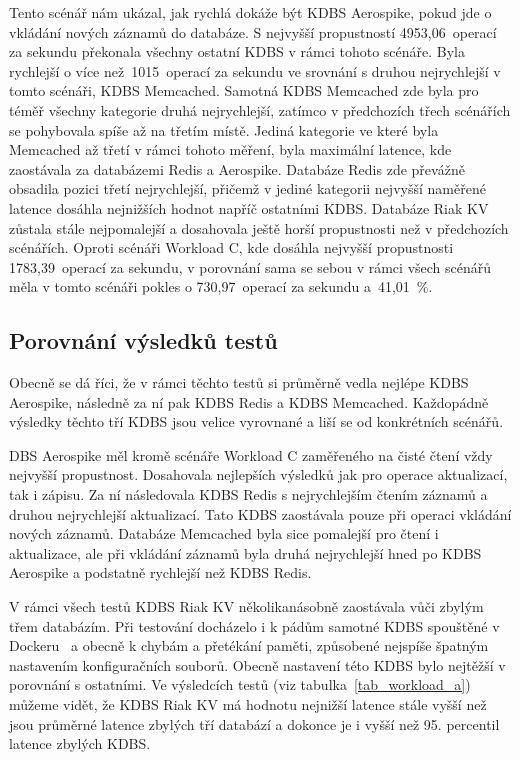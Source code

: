 \documentclass[czech,master,dept460,male,csharp,cpdeclaration]{diploma}
\begin{document}
	Tento scénář nám ukázal, jak rychlá dokáže být KDBS Aerospike, pokud jde o vkládání nových záznamů do databáze. S nejvyšší propustností 4953,06~operací za sekundu překonala všechny ostatní KDBS v rámci tohoto scénáře. Byla rychlejší o více než~1015~operací za sekundu ve srovnání s druhou nejrychlejší v tomto scénáři, KDBS Memcached. Samotná KDBS Memcached zde byla pro téměř všechny kategorie druhá nejrychlejší, zatímco v předchozích třech scénářích se pohybovala spíše až na třetím místě. Jediná kategorie ve které byla Memcached až třetí v rámci tohoto měření, byla maximální latence, kde zaostávala za databázemi Redis a Aerospike. Databáze Redis zde převážně obsadila pozici třetí nejrychlejší, přičemž v jediné kategorii nejvyšší naměřené latence dosáhla nejnižších hodnot napříč ostatními KDBS. Databáze Riak KV zůstala stále nejpomalejší a dosahovala ještě horší propustnosti než v předchozích scénářích. Oproti scénáři Workload C, kde dosáhla nejvyšší propustnosti 1783,39~operací za sekundu, v porovnání sama se sebou v rámci všech scénářů měla v tomto scénáři pokles o 730,97~operací za sekundu a~41,01~\%.
	
	\subsection{Porovnání výsledků testů}
	
	Obecně se dá říci, že v rámci těchto testů si průměrně vedla nejlépe KDBS Aerospike, následně za ní pak KDBS Redis a KDBS Memcached. Každopádně výsledky těchto tří KDBS jsou velice vyrovnané a liší se od konkrétních scénářů.
	
	DBS Aerospike měl kromě scénáře Workload C zaměřeného na čisté čtení vždy nejvyšší propustnost. Dosahovala nejlepších výsledků jak pro operace aktualizací, tak i zápisu. Za ní následovala KDBS Redis s nejrychlejším čtením záznamů a druhou nejrychlejší aktualizací. Tato KDBS zaostávala pouze při operaci vkládání nových záznamů. Databáze Memcached byla sice pomalejší pro čtení i aktualizace, ale při vkládání záznamů byla druhá nejrychlejší hned po KDBS Aerospike a podstatně rychlejší než KDBS Redis.
	
	V rámci všech testů KDBS Riak KV několikanásobně zaostávala vůči zbylým třem databázím. Při testování docházelo i k pádům samotné KDBS spouštěné v Dockeru~\cite{docker} a obecně k chybám a přetékání paměti, způsobené nejspíše špatným nastavením konfiguračních souborů. Obecně nastavení této KDBS bylo nejtěžší v porovnání s ostatními. Ve výsledcích testů (viz tabulka~\ref{tab_workload_a}) můžeme vidět, že KDBS Riak KV má hodnotu nejnižší latence stále vyšší než jsou průměrné latence zbylých tří databází a dokonce je i vyšší než 95. percentil latence zbylých KDBS.
	
\end{document}
